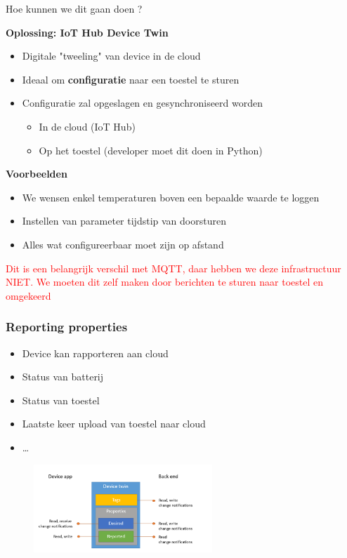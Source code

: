 \documentclass{article}
\newcommand{\bold}[1]{\textbf{#1}}
\begin{document}
Hoe kunnen we dit gaan doen ?

\bold{Oplossing: IoT Hub Device Twin}

\begin{itemize}
    \item Digitale "tweeling" van device in de cloud
    \item Ideaal om \bold{configuratie} naar een toestel te sturen
    \item Configuratie zal opgeslagen en gesynchroniseerd worden
    \begin{itemize}
        \item In de cloud (IoT Hub)
        \item Op het toestel (developer moet dit doen in Python)
    \end{itemize}
\end{itemize}

\bold{Voorbeelden}

\begin{itemize}
    \item We wensen enkel temperaturen boven een bepaalde waarde te loggen
    \item Instellen van parameter tijdstip van doorsturen
    \item Alles wat configureerbaar moet zijn op afstand
\end{itemize}

\textcolor{red}{Dit is een belangrijk verschil met MQTT, daar hebben we deze infrastructuur NIET. We
moeten dit zelf maken door berichten te sturen naar toestel en omgekeerd}

\subsubsection{Reporting properties}

\begin{itemize}
    \item Device kan rapporteren aan cloud
    \item Status van batterij
    \item Status van toestel
    \item Laatste keer upload van toestel naar cloud
    \item \dots
\end{itemize}

\begin{figure}[H]
    \centering
    \includegraphics[width=0.6\textwidth]{iot-device-twin.png}
    \caption{}
\end{figure}
\end{document}
